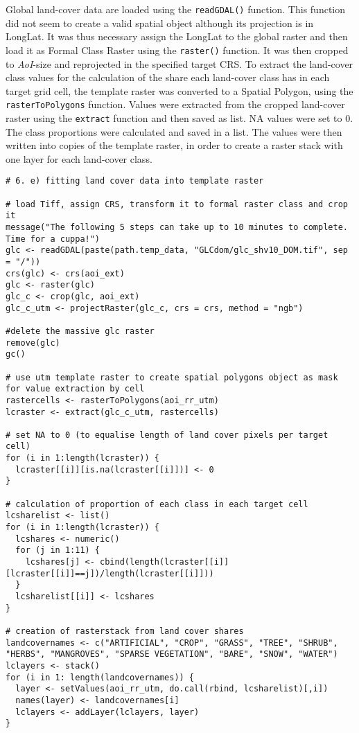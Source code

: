 \documentclass[11pt, a4paper]{article}\usepackage[]{graphicx}\usepackage[]{color}
\begin{document}
Global land-cover data are loaded using the \texttt{readGDAL()} function. This function did not seem to create a valid spatial object although its projection is in LongLat. It was thus necessary assign the LongLat to the global raster and then load it as Formal Class Raster using the \texttt{raster()} function. It was then cropped to \textit{AoI}-size and reprojected in the specified target CRS. To extract the land-cover class values for the calculation of the share each land-cover class has in each target grid cell, the template raster was converted to a Spatial Polygon, using the \texttt{rasterToPolygons} function. Values were extracted from the cropped land-cover raster using the \texttt{extract} function and then saved as list. NA values were set to 0. The class proportions were calculated and saved in a list. The values were then written into copies of the template raster, in order to create a raster stack with one layer for each land-cover class.\newline


\begin{verbatim}
# 6. e) fitting land cover data into template raster

# load Tiff, assign CRS, transform it to formal raster class and crop it
message("The following 5 steps can take up to 10 minutes to complete. Time for a cuppa!")
glc <- readGDAL(paste(path.temp_data, "GLCdom/glc_shv10_DOM.tif", sep = "/"))
crs(glc) <- crs(aoi_ext)
glc <- raster(glc)
glc_c <- crop(glc, aoi_ext)
glc_c_utm <- projectRaster(glc_c, crs = crs, method = "ngb")

#delete the massive glc raster
remove(glc)
gc()

# use utm template raster to create spatial polygons object as mask for value extraction by cell
rastercells <- rasterToPolygons(aoi_rr_utm)
lcraster <- extract(glc_c_utm, rastercells)

# set NA to 0 (to equalise length of land cover pixels per target cell)
for (i in 1:length(lcraster)) {
  lcraster[[i]][is.na(lcraster[[i]])] <- 0
}

# calculation of proportion of each class in each target cell
lcsharelist <- list()
for (i in 1:length(lcraster)) {
  lcshares <- numeric()
  for (j in 1:11) {
    lcshares[j] <- cbind(length(lcraster[[i]][lcraster[[i]]==j])/length(lcraster[[i]]))
  }
  lcsharelist[[i]] <- lcshares
}

# creation of rasterstack from land cover shares
landcovernames <- c("ARTIFICIAL", "CROP", "GRASS", "TREE", "SHRUB", "HERBS", "MANGROVES", "SPARSE VEGETATION", "BARE", "SNOW", "WATER")
lclayers <- stack()
for (i in 1: length(landcovernames)) {
  layer <- setValues(aoi_rr_utm, do.call(rbind, lcsharelist)[,i])
  names(layer) <- landcovernames[i]
  lclayers <- addLayer(lclayers, layer)
}

\end{verbatim}
\end{document}
